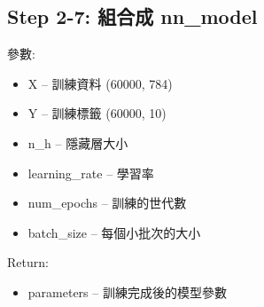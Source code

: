 \documentclass[11pt]{article}
\providecommand{\tightlist}{%
      \setlength{\itemsep}{0pt}\setlength{\parskip}{0pt}}
\begin{document}
    \subsection{Step 2-7: 組合成
nn\_model}\label{step-2-7-ux7d44ux5408ux6210-nn_model}

參數:

\begin{itemize}
\tightlist
\item
  X -- 訓練資料 (60000, 784)
\item
  Y -- 訓練標籤 (60000, 10)
\item
  n\_h -- 隱藏層大小
\item
  learning\_rate -- 學習率
\item
  num\_epochs -- 訓練的世代數
\item
  batch\_size -- 每個小批次的大小
\end{itemize}

Return:

\begin{itemize}
\tightlist
\item
  parameters -- 訓練完成後的模型參數
\end{itemize}
\end{document}
